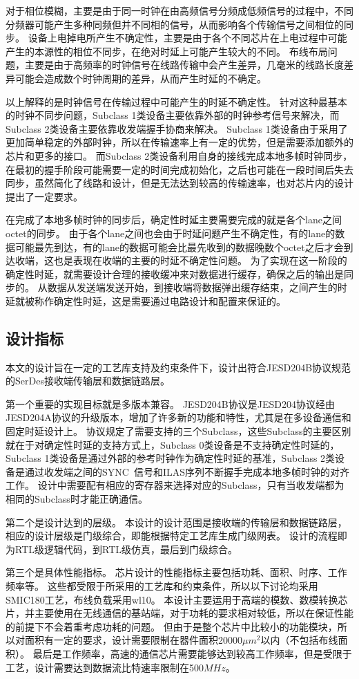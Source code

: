 \documentclass[UTF8]{ctexart}
\begin{document}
对于相位模糊，主要是由于同一时钟在由高频信号分频成低频信号的过程中，不同分频器可能产生多种同频但并不同相的信号，从而影响各个传输信号之间相位的同步。
设备上电掉电所产生不确定性，主要是由于各个不同芯片在上电过程中可能产生的本源性的相位不同步，在绝对时延上可能产生较大的不同。
布线布局问题，主要是由于高频率的时钟信号在线路传输中会产生差异，几毫米的线路长度差异可能会造成数个时钟周期的差异，从而产生时延的不确定。

以上解释的是时钟信号在传输过程中可能产生的时延不确定性。
针对这种最基本的时钟不同步问题，Subclass 1类设备主要依靠外部的时钟参考信号来解决，而Subclass 2类设备主要依靠收发端握手协商来解决。
Subclass 1类设备由于采用了更加简单稳定的外部时钟，所以在传输速率上有一定的优势，但是需要添加额外的芯片和更多的接口。
而Subclass 2类设备利用自身的接线完成本地多帧时钟同步，在最初的握手阶段可能需要一定的时间完成初始化，之后也可能在一段时间后失去同步，虽然简化了线路和设计，但是无法达到较高的传输速率，也对芯片内的设计提出了一定要求。

在完成了本地多帧时钟的同步后，确定性时延主要需要完成的就是各个lane之间octet的同步。
由于各个lane之间也会由于时延问题产生不确定性，有的lane的数据可能最先到达，有的lane的数据可能会比最先收到的数据晚数个octet之后才会到达收端，这也是表现在收端的主要的时延不确定性问题。
为了实现在这一阶段的确定性时延，就需要设计合理的接收缓冲来对数据进行缓存，确保之后的输出是同步的。
从数据从发送端发送开始，到接收端将数据弹出缓存结束，之间产生的时延就被称作确定性时延，这是需要通过电路设计和配置来保证的。

\subsection{设计指标}

本文的设计旨在一定的工艺库支持及约束条件下，设计出符合JESD204B协议规范的SerDes接收端传输层和数据链路层。

第一个重要的实现目标就是多版本兼容。
JESD204B协议是JESD204协议经由JESD204A协议的升级版本，增加了许多新的功能和特性，尤其是在多设备通信和固定时延设计上。
协议规定了需要支持的三个Subclass，这些Subclass的主要区别就在于对确定性时延的支持方式上，Subclass 0类设备是不支持确定性时延的，Subclass 1类设备是通过外部的参考时钟作为确定性时延的基准，Subclass 2类设备是通过收发端之间的SYNC~信号和ILAS序列不断握手完成本地多帧时钟的对齐工作。
设计中需要配有相应的寄存器来选择对应的Subclass，只有当收发端都为相同的Subclass时才能正确通信。

第二个是设计达到的层级。
本设计的设计范围是接收端的传输层和数据链路层，相应的设计层级是门级综合，即能根据特定工艺库生成门级网表。
设计的流程即为RTL级逻辑代码，到RTL级仿真，最后到门级综合。

第三个是具体性能指标。
芯片设计的性能指标主要包括功耗、面积、时序、工作频率等。
这些都受限于所采用的工艺库和约束条件，所以以下讨论均采用SMIC180工艺，布线负载采用wl10。
本设计主要运用于高端的模数、数模转换芯片，并主要使用在无线通信的基站端，对于功耗的要求相对较低，所以在保证性能的前提下不会着重考虑功耗的问题。
但由于是整个芯片中比较小的功能模块，所以对面积有一定的要求，设计需要限制在器件面积20000$\mu m^2$以内（不包括布线面积）。
最后是工作频率，高速的通信芯片需要能够达到较高工作频率，但是受限于工艺，设计需要达到数据流比特速率限制在500$MHz$。


\end{document}
